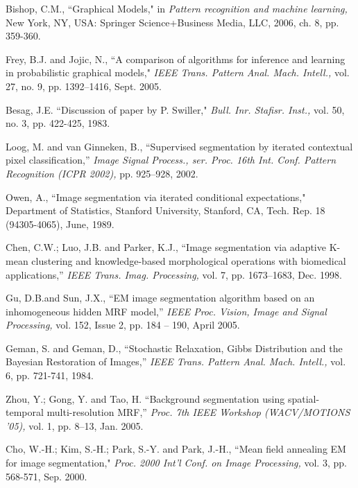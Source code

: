 \documentclass{article} %
\begin{document}
\small{
\begin{thebibliography}{1}

 Bishop, C.M., ``Graphical Models," in \textit{Pattern recognition and machine learning,} New York, NY, USA: Springer Science+Business Media, LLC, 2006, ch. 8, pp. 359-360.

 Frey, B.J. and Jojic, N., ``A comparison of algorithms for inference and learning in probabilistic graphical models," \textit{IEEE Trans. Pattern Anal. Mach. Intell.,} vol. 27, no. 9, pp. 1392–1416, Sept. 2005.

 Besag, J.E. ``Discussion of paper by P. Swiller," \textit{Bull. Inr. Stafisr. Inst.,} vol. 50, no. 3, pp. 422-425, 1983.

 Loog, M. and van Ginneken, B., ``Supervised segmentation by iterated contextual pixel classification,” \textit{Image Signal Process., ser. Proc. 16th Int. Conf. Pattern Recognition (ICPR 2002),} pp. 925–928, 2002.

 Owen, A., ``Image segmentation via iterated conditional expectations," Department of Statistics, Stanford University, Stanford, CA, Tech. Rep. 18 (94305-4065), June, 1989.

 Chen, C.W.; Luo, J.B. and Parker, K.J., ``Image segmentation via adaptive K-mean clustering and knowledge-based morphological operations with biomedical applications,” \textit{IEEE Trans. Imag. Processing,} vol. 7, pp. 1673–1683, Dec. 1998.

 Gu, D.B.and Sun, J.X., ``EM image segmentation algorithm based on an inhomogeneous hidden MRF model,” \textit{IEEE Proc. Vision, Image and Signal Processing,} vol. 152, Issue 2, pp. 184 – 190, April 2005.

 Geman, S. and Geman, D., ``Stochastic Relaxation, Gibbs Distribution and the Bayesian Restoration of Images,” \textit{IEEE Trans. Pattern Anal. Mach. Intell.,} vol. 6, pp. 721-741, 1984.

 Zhou, Y.; Gong, Y. and Tao, H. ``Background segmentation using spatial-temporal multi-resolution MRF,” \textit{Proc. 7th IEEE Workshop (WACV/MOTIONS '05),} vol. 1, pp. 8–13, Jan. 2005.

 Cho, W.-H.; Kim, S.-H.; Park, S.-Y. and Park, J.-H., ``Mean field annealing EM for image segmentation," \textit{Proc. 2000 Int’l Conf. on Image Processing,} vol. 3, pp. 568-571, Sep. 2000.
  \end{thebibliography}
}
\end{document}
